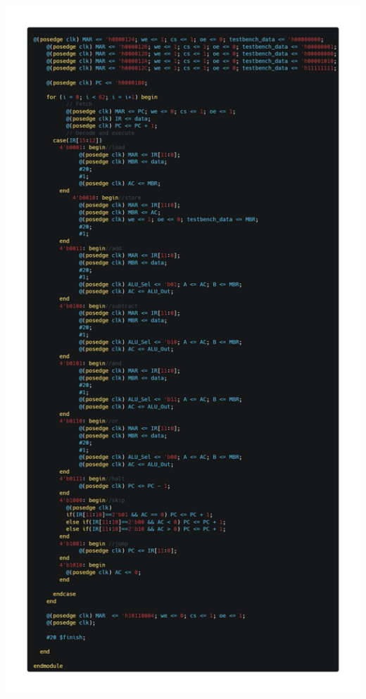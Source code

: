 \documentclass[12pt]{article}
\begin{document}
\begin{center}
    \includegraphics[scale=0.35]{images/a_2.png}
\end{center}


\newpage
\end{document}
